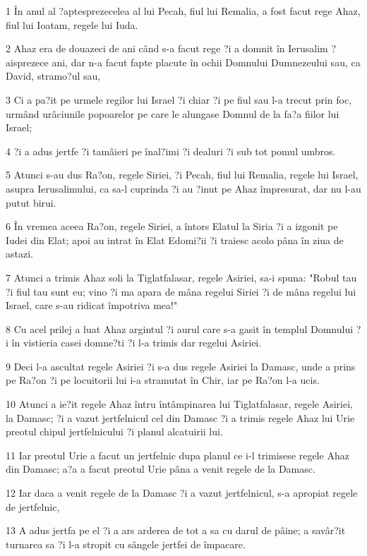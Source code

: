 \par 1 În anul al ?aptesprezecelea al lui Pecah, fiul lui Remalia, a fost facut rege Ahaz, fiul lui Ioatam, regele lui Iuda.
\par 2 Ahaz era de douazeci de ani când s-a facut rege ?i a domnit în Ierusalim ?aisprezece ani, dar n-a facut fapte placute în ochii Domnului Dumnezeului sau, ca David, stramo?ul sau,
\par 3 Ci a pa?it pe urmele regilor lui Israel ?i chiar ?i pe fiul sau l-a trecut prin foc, urmând urâciunile popoarelor pe care le alungase Domnul de la fa?a fiilor lui Israel;
\par 4 ?i a adus jertfe ?i tamâieri pe înal?imi ?i dealuri ?i sub tot pomul umbros.
\par 5 Atunci s-au dus Ra?on, regele Siriei, ?i Pecah, fiul lui Remalia, regele lui Israel, asupra Ierusalimului, ca sa-l cuprinda ?i au ?inut pe Ahaz împresurat, dar nu l-au putut birui.
\par 6 În vremea aceea Ra?on, regele Siriei, a întors Elatul la Siria ?i a izgonit pe Iudei din Elat; apoi au intrat în Elat Edomi?ii ?i traiesc acolo pâna în ziua de astazi.
\par 7 Atunci a trimis Ahaz soli la Tiglatfalasar, regele Asiriei, sa-i spuna: "Robul tau ?i fiul tau sunt eu; vino ?i ma apara de mâna regelui Siriei ?i de mâna regelui lui Israel, care s-au ridicat împotriva mea!"
\par 8 Cu acel prilej a luat Ahaz argintul ?i aurul care s-a gasit în templul Domnului ?i în vistieria casei domne?ti ?i l-a trimis dar regelui Asiriei.
\par 9 Deci l-a ascultat regele Asiriei ?i s-a dus regele Asiriei la Damasc, unde a prins pe Ra?on ?i pe locuitorii lui i-a stramutat în Chir, iar pe Ra?on l-a ucis.
\par 10 Atunci a ie?it regele Ahaz întru întâmpinarea lui Tiglatfalasar, regele Asiriei, la Damasc; ?i a vazut jertfelnicul cel din Damasc ?i a trimis regele Ahaz lui Urie preotul chipul jertfelnicului ?i planul alcatuirii lui.
\par 11 Iar preotul Urie a facut un jertfelnic dupa planul ce i-l trimisese regele Ahaz din Damasc; a?a a facut preotul Urie pâna a venit regele de la Damasc.
\par 12 Iar daca a venit regele de la Damasc ?i a vazut jertfelnicul, s-a apropiat regele de jertfelnic,
\par 13 A adus jertfa pe el ?i a ars arderea de tot a sa cu darul de pâine; a savâr?it turnarea sa ?i l-a stropit cu sângele jertfei de împacare.

